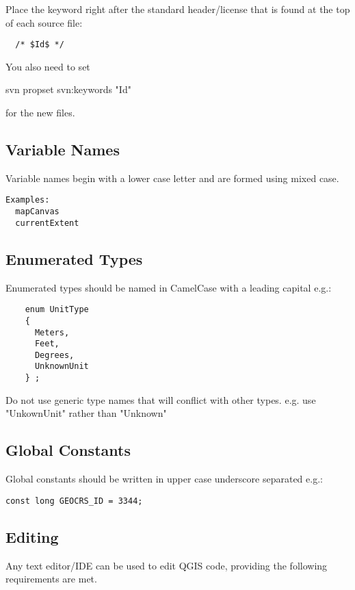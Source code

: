 Place the keyword right after the standard header/license that is found at the
top of each source file:

\begin{verbatim}
  /* $Id$ */
\end{verbatim}

You also need to set 

svn propset svn:keywords "Id"

for the new files.

\hypertarget{toc14}{}
\subsection{Variable Names}
Variable names begin with a lower case letter and are formed using mixed case.

\begin{verbatim}
Examples:
  mapCanvas
  currentExtent
\end{verbatim}

\hypertarget{toc15}{}
\subsection{Enumerated Types}
Enumerated types should be named in CamelCase with a leading capital e.g.:

\begin{verbatim}
    enum UnitType
    {
      Meters,
      Feet,
      Degrees,
      UnknownUnit
    } ;
\end{verbatim}

Do not use generic type names that will conflict with other types. e.g. use
"UnkownUnit" rather than "Unknown"

\hypertarget{toc16}{}
\subsection{Global Constants}
Global constants should be written in upper case underscore separated e.g.:

\begin{verbatim}
const long GEOCRS_ID = 3344;
\end{verbatim}

\hypertarget{toc17}{}
\subsection{Editing}
Any text editor/IDE can be used to edit QGIS code, providing the following
requirements are met.

